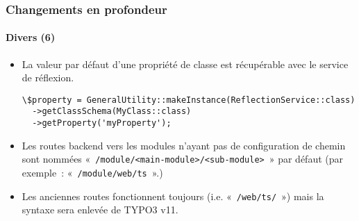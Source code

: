 \begin{frame}[fragile]
	\frametitle{Changements en profondeur}
	\framesubtitle{Divers (6)}

	\lstset{basicstyle=\tiny\ttfamily}

	\begin{itemize}
		\item La valeur par défaut d'une propriété de classe est récupérable avec le service de réflexion.
\begin{lstlisting}
\$property = GeneralUtility::makeInstance(ReflectionService::class)
  ->getClassSchema(MyClass::class)
  ->getProperty('myProperty');
\end{lstlisting}

		\item Les routes backend vers les modules n'ayant pas de configuration de chemin sont nommées\newline
			«~\texttt{/module/<main-module>/<sub-module>}~» par défaut\newline
			\small
				(par exemple~: «~\texttt{/module/web/ts}~».)
			\normalsize

		\item Les anciennes routes fonctionnent toujours (i.e. «~\texttt{/web/ts/}~») mais la syntaxe sera
			enlevée de TYPO3 v11.

	\end{itemize}

\end{frame}


